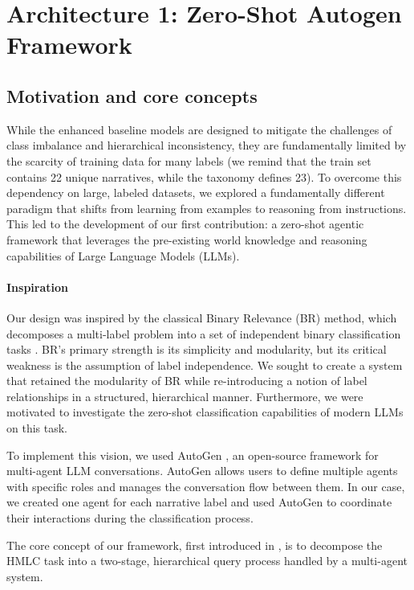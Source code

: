 \section{Architecture 1: Zero-Shot Autogen Framework}
\label{sec:autogen_architecture}

\subsection{Motivation and core concepts}

While the enhanced baseline models are designed to mitigate the challenges of class imbalance and hierarchical inconsistency, they are fundamentally limited by the scarcity of training data for many labels (we remind that the train set contains 22 unique narratives, while the taxonomy defines 23). To overcome this dependency on large, labeled datasets, we explored a fundamentally different paradigm that shifts from learning from examples to reasoning from instructions. This led to the development of our first contribution: a zero-shot agentic framework that leverages the pre-existing world knowledge and reasoning capabilities of Large Language Models (LLMs).

\paragraph{Inspiration}
Our design was inspired by the classical Binary Relevance (BR) method, which decomposes a multi-label problem into a set of independent binary classification tasks \cite{zhang_binary_2018}. BR's primary strength is its simplicity and modularity, but its critical weakness is the assumption of label independence. We sought to create a system that retained the modularity of BR while re-introducing a notion of label relationships in a structured, hierarchical manner. Furthermore, we were motivated to investigate the zero-shot classification capabilities of modern LLMs on this task.

To implement this vision, we used AutoGen \cite{Wu2024AutoGen}, an open-source framework for multi-agent LLM conversations. AutoGen allows users to define multiple agents with specific roles and manages the conversation flow between them. In our case, we created one agent for each narrative label and used AutoGen to coordinate their interactions during the classification process.

The core concept of our framework, first introduced in \cite{eljadiri-nurbakova-2025-team}, is to decompose the HMLC task into a two-stage, hierarchical query process handled by a multi-agent system.

